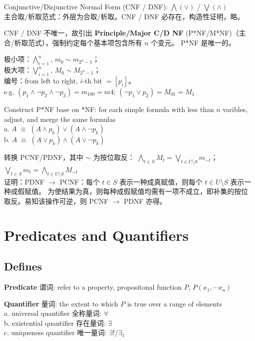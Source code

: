 \documentclass[12pt, a4paper, UTF8, openany]{ctexbook}
\newcommand{\bigand}{\bigwedge}
\newcommand{\bigor}{\bigvee}
\begin{document}
        Conjunctive/Disjunctive Normal Form (CNF / DNF): $\bigand(\lor)$ / $\bigor(\land)$ \\
        主合取/析取范式：外层为合取/析取。CNF / DNF 必存在，构造性证明，略。

        CNF / DNF 不唯一，故引出 \textbf{Principle/Major C/D NF} (P*NF/M*NF)（主合/析取范式），强制约定每个基本项包含所有 $n$ 个变元。
        P*NF 是唯一的。

        极小项：$\bigand_{i = 1}^{n}$, $m_{0} \sim m_{2^n - 1}$；\\
        极大项：$\bigor_{i = 1}^{n}$, $M_{0} \sim M_{2^n - 1}$；\\
        编号：from left to right, $i$-th bit $= [p_i]$。\\
        e.g. $(p_1 \land \lnot p_2 \land \lnot p_3) = m_{100} = m{4}$; $(\lnot p_1 \lor p_2) = M_{01} = M_{1}$

        Construct P*NF base on *NF: for each simple formula with less than $n$ varibles, 
        adjust, and merge the same formulas \\
        a. $A \; \equiv \; (A \land p_k) \lor (A \land \lnot p_k)$ \\
        b. $A \; \equiv \; (A \lor p_k) \land (A \lor \lnot p_k)$

        转换 PCNF/PDNF，其中 $\sim$ 为按位取反：
        $\mathop{\bigand}\limits_{t \in S} M_{t} = \mathop{\bigor}\limits_{t \in U \setminus S} m_{\sim t}$；
        $\mathop{\bigor}\limits_{t \in S} m_{t} = \mathop{\bigand}\limits_{t \in U \setminus S} M_{\sim t}$ \\
        证明：PDNF $\to$ PCNF：每个 $t \in S$ 表示一种成真赋值，则每个 $t \in U \setminus S$ 表示一种成假赋值。
        为使结果为真，则每种成假赋值均需有一项不成立，即补集的按位取反。易知该操作可逆，则 PCNF $\to$ PDNF 亦得。

    \section{Predicates and Quantifiers}
        \subsection{Defines}
        \textbf{Predicate} 谓词: refer to a property, propositonal function $P$, $P(x_1, \cdots x_n)$

        \textbf{Quantifier} 量词: the extent to which $P$ is true over a range of elements \\
        a. universal quantifier 全称量词: $\forall$ \\
        b. existential quantifier 存在量词: $\exists$ \\
        c. uniqueness quantifier 唯一量词: $\exists!$/$\exists_1$
\end{document}
